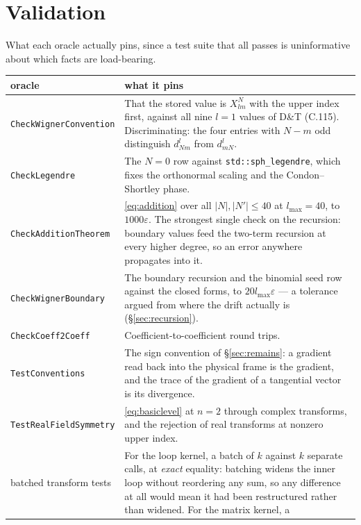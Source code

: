 \documentclass[11pt,a4paper]{article}
\newcommand{\code}[1]{\texttt{#1}}
\begin{document}
\section{Validation}
\label{sec:validation}

What each oracle actually pins, since a test suite that all passes is
uninformative about which facts are load-bearing.

\begin{center}
\begin{tabular}{lp{9.2cm}}
  \toprule
  oracle & what it pins \\
  \midrule
  \code{CheckWignerConvention}
    & That the stored value is $X^N_{lm}$ with the upper index first,
      against all nine $l=1$ values of D\&T (C.115).  Discriminating:
      the four entries with $N-m$ odd distinguish $d^l_{Nm}$ from
      $d^l_{mN}$. \\
  \code{CheckLegendre}
    & The $N=0$ row against \code{std::sph\_legendre}, which fixes the
      orthonormal scaling and the Condon--Shortley phase. \\
  \code{CheckAdditionTheorem}
    & \eqref{eq:addition} over all $|N|,|N'|\leq 40$ at $l_{\max}=40$, to
      $1000\varepsilon$.  The strongest single check on the recursion:
      boundary values feed the two-term recursion at every higher degree,
      so an error anywhere propagates into it. \\
  \code{CheckWignerBoundary}
    & The boundary recursion and the binomial seed row against the closed
      forms, to $20 l_{\max}\varepsilon$ --- a tolerance argued from where
      the drift actually is (\S\ref{sec:recursion}). \\
  \code{CheckCoeff2Coeff}
    & Coefficient-to-coefficient round trips. \\
  \code{TestConventions}
    & The sign convention of \S\ref{sec:remains}: a gradient read back
      into the physical frame is the gradient, and the trace of the
      gradient of a tangential vector is its divergence. \\
  \code{TestRealFieldSymmetry}
    & \eqref{eq:basiclevel} at $n=2$ through complex transforms, and the
      rejection of real transforms at nonzero upper index. \\
  batched transform tests
    & For the loop kernel, a batch of $k$ against $k$ separate calls, at
      \emph{exact} equality: batching widens the inner loop without
      reordering any sum, so any difference at all would mean it had been
      restructured rather than widened.  For the matrix kernel, a

\end{tabular}
\end{center}
\end{document}
